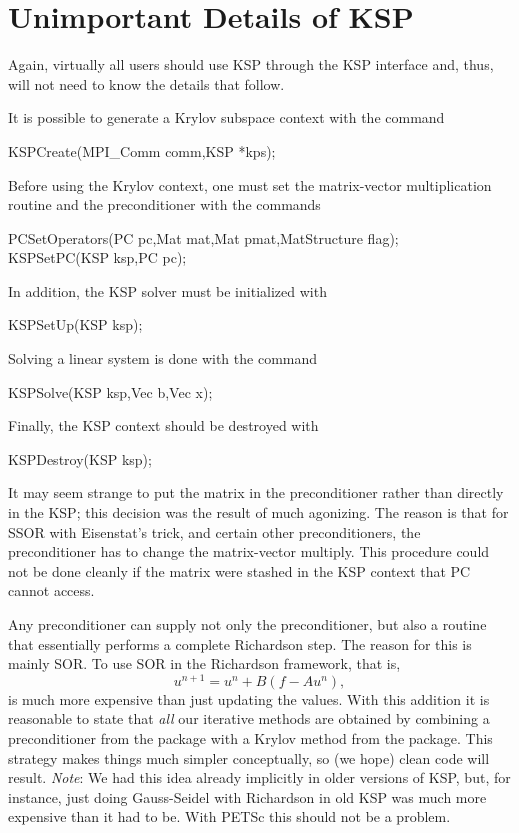 {{{\section{Unimportant Details of KSP}

Again, virtually all users should use KSP through the KSP interface
and, thus, will not need to know the details that follow. 

It is possible to generate a Krylov subspace context with the 
command 
\begin{tabbing}
  KSPCreate(MPI\_Comm comm,KSP *kps);
\end{tabbing}
Before using the Krylov context, one must set the matrix-vector multiplication routine and
the preconditioner with the 
commands
\begin{tabbing}
  PCSetOperators(PC pc,Mat mat,Mat pmat,MatStructure flag);\\
  KSPSetPC(KSP ksp,PC pc);
\end{tabbing}
In addition, the KSP solver must be initialized with
\begin{tabbing}
  KSPSetUp(KSP ksp);
\end{tabbing}
Solving a linear system is done with the command
\begin{tabbing}
  KSPSolve(KSP ksp,Vec b,Vec x);
\end{tabbing}
Finally, the KSP context should be destroyed with
\begin{tabbing}
  KSPDestroy(KSP ksp);
\end{tabbing}

It may seem strange to put the matrix in the preconditioner rather
than directly in the KSP; this decision was the result of much
agonizing. The reason is that for SSOR with Eisenstat's trick, and 
certain other preconditioners, the
preconditioner has to change the matrix-vector multiply.  This 
procedure could not
be done cleanly if the matrix were stashed in the KSP context that
PC cannot access.

Any preconditioner can supply not 
only the preconditioner, but also a routine that essentially performs a
complete Richardson step. The reason for this is mainly SOR. To 
use SOR in the Richardson framework, that is,
\[
  u^{n+1} = u^{n} + B(f - A u^{n}), 
\]
is much more expensive than just updating the values.
With this addition it is reasonable to state that {\em all} our
iterative methods are obtained by combining a preconditioner from 
the  package with a Krylov method from the 
package. This strategy makes things much simpler conceptually, so 
(we hope)
clean code will result. {\em Note}: We had this idea already implicitly in 
older versions of KSP, but, for instance, just doing Gauss-Seidel
with Richardson in old KSP was much more expensive than it had to be. 
With PETSc this should not be a problem. 

}}}
